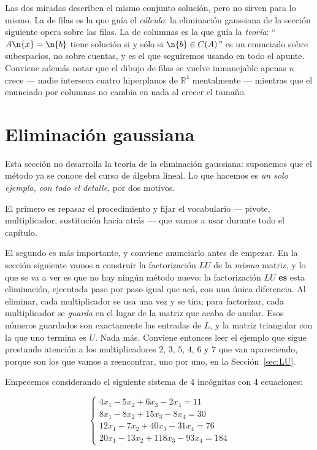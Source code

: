 \medskip

Las dos miradas describen el mismo conjunto solución, pero no sirven para lo
mismo. La de filas es la que guía el \emph{cálculo}: la eliminación gaussiana
de la sección siguiente opera sobre las filas. La de columnas es la que guía la
\emph{teoría}: ``$A\n{x}=\n{b}$ tiene solución si y sólo si $\n{b}\in C(A)$'' es
un enunciado sobre subespacios, no sobre cuentas, y es el que seguiremos usando
en todo el apunte. Conviene además notar que el dibujo de filas se vuelve
inmanejable apenas $n$ crece --- nadie interseca cuatro hiperplanos de
$\mathbb{R}^4$ mentalmente --- mientras que el enunciado por columnas no cambia
en nada al crecer el tamaño.

\section{Eliminación gaussiana}\label{sec:eliminacion}

Esta sección no desarrolla la teoría de la eliminación gaussiana: suponemos que
el método ya se conoce del curso de álgebra lineal. Lo que hacemos es
\emph{un solo ejemplo, con todo el detalle}, por dos motivos.

El primero es repasar el procedimiento y fijar el vocabulario --- pivote,
multiplicador, sustitución hacia atrás --- que vamos a usar durante todo el
capítulo.

El segundo es más importante, y conviene anunciarlo antes de empezar. En la
sección siguiente vamos a construir la factorización $LU$ de la \emph{misma}
matriz, y lo que se va a ver es que no hay ningún método nuevo: la
factorización $LU$ \textbf{es} esta eliminación, ejecutada paso por paso igual
que acá, con una única diferencia. Al eliminar, cada multiplicador se usa una
vez y se tira; para factorizar, cada multiplicador se \emph{guarda} en el lugar
de la matriz que acaba de anular. Esos números guardados son exactamente las
entradas de $L$, y la matriz triangular con la que uno termina es $U$. Nada
más. Conviene entonces leer el ejemplo que sigue prestando atención a los
multiplicadores $2$, $3$, $5$, $4$, $6$ y $7$ que van apareciendo, porque son
los que vamos a reencontrar, uno por uno, en la Sección~\ref{sec:LU}.

Empecemos considerando el siguiente sistema de 4 incógnitas con 4 ecuaciones:

\begin{equation*}
\begin{cases}
4x_1 - 5x_2 + 6x_3 - 2x_4 = 11 \\
8x_1 - 8x_2 + 15x_3 - 8x_4 = 30 \\
12x_1 - 7x_2 + 40x_3 - 31x_4 = 76 \\
20x_1 - 13x_2 + 118x_3 - 93x_4 = 184
\end{cases}
\end{equation*}

